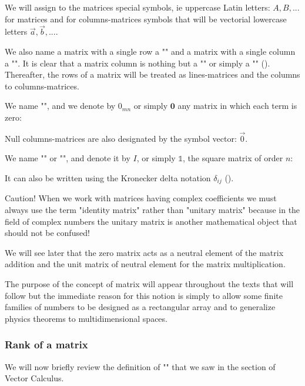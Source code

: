 	
	We will assign to the matrices special symbols, ie uppercase Latin letters: $A, B, ...$ for matrices and for columns-matrices symbols that will be vectorial lowercase letters $\vec{a},\vec{b},...$.
	
	We also name a matrix with a single row a "" and a matrix with a single column a "". It is clear that a matrix column is nothing but a "" or simply a "" (). Thereafter, the rows of a matrix will be treated as lines-matrices and the columns to columns-matrices.
	
	We name "", and we denote by $0_{mn}$ or simply $\mathbf{0}$ any matrix in which each term is zero:
		
	Null columns-matrices are also designated by the symbol vector: $\vec{0}$.
	
	We name "" or "", and denote it by $I$, or simply $\mathds{1}$, the square matrix of order $n$:
	
	It can also be written using the Kronecker delta notation $\delta_{ij}$ ().
	
	Caution! When we work with matrices having complex coefficients we must always use the term "identity matrix" rather than "unitary matrix" because in the field of complex numbers the unitary matrix is another mathematical object that should not be confused!
	
	We will see later that the zero matrix acts as a neutral element of the matrix addition and the unit matrix of neutral element for the matrix multiplication.
	
	The purpose of the concept of matrix will appear throughout the texts that will follow but the immediate reason for this notion is simply to allow some finite families of numbers to be designed as a rectangular array and to generalize physics theorems to multidimensional spaces.
	
	\subsubsection{Rank of a matrix}
	We will now briefly review the definition of "" that we saw in the section of Vector Calculus.
	
